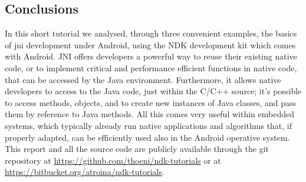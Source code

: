 \documentclass[a4paper,10pt]{article}
\begin{document}
\begin{multicols}{2}

\section{Conclusions}
In this short tutorial we analysed, through three convenient examples, the
basics of jni development under Android, using the NDK development kit which
comes with Android. JNI offers developers a powerful way to reuse their existing
native code, or to implement critical and performance efficient functions in
native code, that can be accessed by the Java environment. Furthermore, it
allows native developers to access to the Java code, just within the C/C++
source; it's possible to access methods, objects, and to create new instances of
Java classes, and pass them by reference to Java methods. All this comes very
useful within embedded systems, which typically already run native applications
and algorithms that, if properly adapted, can be efficiently used also in the
Android operative system.\\
This report and all the source code are publicly available through the git
repository at \url{https://github.com/thoeni/ndk-tutorials} or at
\url{https://bitbucket.org/atroina/ndk-tutorials}.

\nocite{liang1999jni}
\nocite{marakanajni}
\nocite{learningandroid}
\nocite{programmingandroid}




\end{multicols}
\end{document}
